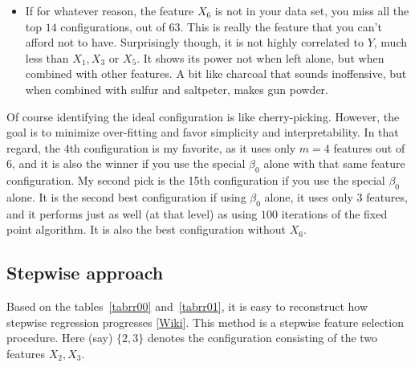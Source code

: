 \documentclass[oneside,10pt]{book}
\begin{document}
\begin{itemize}
\item If for whatever reason, the feature $X_6$ is not in your data set, you miss all the top $14$ configurations, out of $63$. This is really the feature that you can't afford not to have. Surprisingly though, it is not highly correlated to $Y$, much less than $X_1, X_3$ or $X_5$. It shows its power not when left alone, but when combined
with other features. A bit like charcoal that sounds inoffensive, but when combined with sulfur and saltpeter, makes gun powder.
\end{itemize}
Of course identifying the ideal configuration is like cherry-picking. However, the goal is to minimize over-fitting and favor simplicity and interpretability. In that regard, the $4$th configuration is my favorite, as it uses only $m=4$ features out of $6$, and it is also the winner if you use the special $\beta_0$ alone with that same feature configuration. My second pick is the 15th configuration if you use the special $\beta_0$ alone. It is the second best configuration if using $\beta_0$ alone, it uses only $3$ features, and it performs just as well (at that level) as using $100$ iterations of the fixed point algorithm. It is also the best configuration without $X_6$. 

\subsection{Stepwise approach}\label{stepw}

Based on the tables~\ref{tabrr00} and~\ref{tabrr01}, it is easy to reconstruct how \textcolor{index}{stepwise regression} progresses [\href{https://en.wikipedia.org/wiki/Stepwise_regression}{Wiki}].  This method is a stepwise feature
selection procedure. Here (say) $\{2,3\}$ denotes the configuration consisting of the two features $X_2, X_3$.
\end{document}
